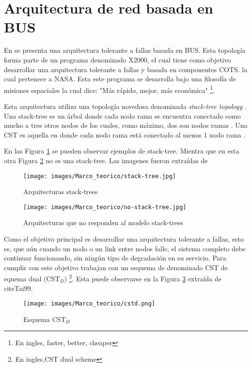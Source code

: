  \section{Arquitectura de red basada en BUS}
En \cite{Tai99} se presenta una arquitectura tolerante a fallas basada en BUS. Esta topología forma parte de un programa denominado X2000, el cual tiene como objetivo desarrollar una arquitectura tolerante a fallas y basada en componentes COTS. la cual pertenece a \ac{NASA}. Esta este programa se desarrolla bajo una filosofía de misiones espaciales la cual dice: "Más rápido, mejor, más económica" \footnote{En ingles, faster, better, cheaper}.

Esta arquitectura utiliza una topología novedosa denominada \textit{stack-tree topology} \citep{Chau99} \citep{Tai99}. Una stack-tree es un árbol donde cada nodo rama se encuentra conectado como mucho a tres otros nodos de los cuales, como máximo, dos son nodos ramas \citep{Tai99}. Una \ac{CST} es aquella en donde cada nodo rama está conectado al menos 1 nodo rama \citep{Tai99}.

En las Figura \ref{fig:stack-tree} se pueden observar ejemplos de stack-tree. Mientra que en esta otra Figura \ref{fig:no-stack-tree} no es una stack-tree. Las imagenes fueron extraídas de \cite{Tai99}

\begin{figure}[h]
 \centering
 \texttt{[image: images/Marco\_teorico/stack-tree.jpg]}
  \caption{Arquitecturas stack-trees}
\label{fig:stack-tree}
\end{figure}

\begin{figure}[h]
 \centering
 \texttt{[image: images/Marco\_teorico/no-stack-tree.jpg]}
  \caption{Arquitecturas que no responden al modelo stack-trees}
\label{fig:no-stack-tree}
\end{figure}

Como el objetivo principal es desarrollar una arquitectura tolerante a fallas, esto es, que aún cuando un nodo o un link entre nodos falle, el sistema completo debe continuar funcionando, sin ningún tipo de degradación en su servicio. Para cumplir con este objetivo \cite{Tai99} trabajan con un esquema de denominado \ac{CST} de equema dual (\ac{CST}$_D$) \footnote{En ingles,\ac{CST} dual scheme}. Esta puede observarse en la Figura \ref{fig:cstd} extraída de cite{Tai99}.

\begin{figure}[h]
 \centering
 \texttt{[image: images/Marco\_teorico/cstd.png]}
  \caption{Esquema CST$_D$}
\label{fig:cstd}
\end{figure}


